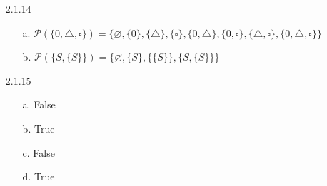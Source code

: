 \documentclass[11pt]{amsart}
\theoremstyle{definition}
\begin{document}
\begin{itemize}
\begin{itemize}
\begin{proof}
        \paragraph{Case 1:}
            if $x\ge 0$ then $0=3x^2-12$ and therefore $0=x^2-4\implies x=2$. $x$ can only be $2$ for this case
        \paragraph{Case 2:}
            if $x< 0$ then $0=3x^2+16x-12$ and therefore $x=\frac{-16\pm\sqrt{16^2-4(3)(-12)}}6
            =\frac{-16\pm\sqrt{400}}{6}=-\frac{8}{3}\pm \frac{10}{3}=-6\text{ or }\frac 23$. Thus $x$ can only be equal to $6$ for this case.
        Thus we've shown that the only real numbers $x$ that satisfy satisfy $|x-4|=2|x|-2$ are all of the elements of $\{-6,2\}.$ Therefore we've proved that $\{x\in\mathbb{R},|x-4|=2|x|-2\}=\{-6,2\}$.
    \end{proof}

\end{itemize}

\item[2.1.14]
\begin{itemize}
    \item[a.] $\mathcal{P}(\{0,\triangle,\square\})=
    \{\varnothing,\{0\},\{\triangle\},\{\square\},\{0,\triangle\},\{0,\square\},\{\triangle,\square\},\{0,\triangle,\square\}\}$

    \item[b.] $\mathcal{P}(\{S,\{S\}\})=\{\varnothing,\{S\},\{\{S\}\},\{S,\{S\}\}\}$

\end{itemize}

\item[2.1.15]
\begin{itemize}
    \item[a.] False

    \item[b.] True

    \item[c.] False

    \item[d.] True

\end{itemize}

\end{itemize}
\end{document}
